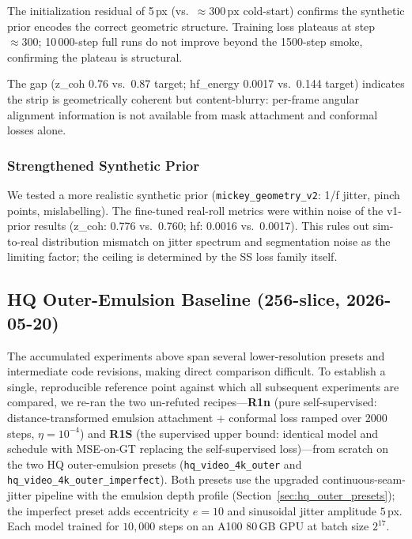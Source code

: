 \documentclass[11pt,a4paper]{article}
\begin{document}
The initialization residual of 5\,px (vs.\ $\approx 300\,\text{px}$ cold-start) confirms the synthetic prior encodes the correct geometric structure. Training loss plateaus at step $\approx 300$; 10\,000-step full runs do not improve beyond the 1500-step smoke, confirming the plateau is structural.

The gap (z\_coh 0.76 vs.\ 0.87 target; hf\_energy 0.0017 vs.\ 0.144 target) indicates the strip is geometrically coherent but content-blurry: per-frame angular alignment information is not available from mask attachment and conformal losses alone.

\subsubsection{Strengthened Synthetic Prior}

We tested a more realistic synthetic prior (\texttt{mickey\_geometry\_v2}: 1/f jitter, pinch points, mislabelling). The fine-tuned real-roll metrics were within noise of the v1-prior results (z\_coh: 0.776 vs.\ 0.760; hf: 0.0016 vs.\ 0.0017). This rules out sim-to-real distribution mismatch on jitter spectrum and segmentation noise as the limiting factor; the ceiling is determined by the SS loss family itself.

\subsection{HQ Outer-Emulsion Baseline (256-slice, 2026-05-20)}
\label{sec:hq_baseline}

The accumulated experiments above span several lower-resolution presets and intermediate code revisions, making direct comparison difficult. To establish a single, reproducible reference point against which all subsequent experiments are compared, we re-ran the two un-refuted recipes—\textbf{R1n} (pure self-supervised: distance-transformed emulsion attachment + conformal loss ramped over 2000 steps, $\eta = 10^{-4}$) and \textbf{R1S} (the supervised upper bound: identical model and schedule with MSE-on-GT replacing the self-supervised loss)—from scratch on the two HQ outer-emulsion presets (\texttt{hq\_video\_4k\_outer} and \texttt{hq\_video\_4k\_outer\_imperfect}). Both presets use the upgraded continuous-seam-jitter pipeline with the emulsion depth profile (Section~\ref{sec:hq_outer_presets}); the imperfect preset adds eccentricity $e = 10$ and sinusoidal jitter amplitude $5$\,px. Each model trained for $10{,}000$ steps on an A100 80\,GB GPU at batch size $2^{17}$.
\end{document}
